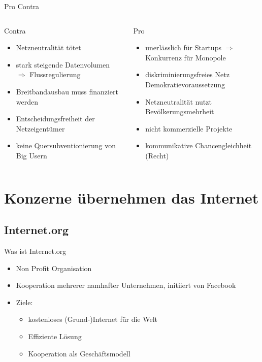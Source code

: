 \documentclass{beamer}
\begin{document}
\begin{frame}{Pro Contra}
\begin{columns}[t]
    \begin{column}{.5\textwidth}      	
		\begin{block}{Contra}
       	\begin{itemize}
			\item Netzneutralität tötet
			\item stark steigende Datenvolumen \(\Rightarrow\) Flussregulierung
			\item Breitbandausbau muss finanziert werden
			\item Entscheidungsfreiheit der Netzeigentümer
			\item keine Quersubventionierung von Big Usern
       	\end{itemize}
		\end{block}
    \end{column}
	\begin{column}{.5\textwidth}
		\uncover<2> {
      	\begin{block}{Pro}
		\begin{itemize}
			\item unerlässlich für Startups \(\Rightarrow\) Konkurrenz für Monopole
			\item diskriminierungsfreies Netz Demokratievoraussetzung
			\item Netzneutralität nutzt Bevölkerungsmehrheit
			\item nicht kommerzielle Projekte
			\item kommunikative Chancengleichheit (Recht)
		\end{itemize}
		\end{block}		
		}
	\end{column}
\end{columns}
\end{frame}


\section{Konzerne übernehmen das Internet}
\subsection{Internet.org}
\begin{frame}{Was ist Internet.org}
\begin{itemize}
	\item Non Profit Organisation
	\item Kooperation mehrerer namhafter Unternehmen, initiiert von Facebook
	\item Ziele: 
	\begin{itemize}%
		\item kostenloses (Grund-)Internet für die Welt
		\item Effiziente Lösung
		\item Kooperation als Geschäftsmodell
	\end{itemize}
\end{itemize}
\end{frame}
\end{document}
